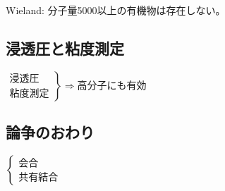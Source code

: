 \documentclass{../../../notebook}
\begin{document}
\par

Wieland: 分子量5000以上の有機物は存在しない。

\setcounter{subsection}{3}
\subsection{浸透圧と粘度測定}

$\left.\begin{array}{l}
\mathrm{浸透圧}\\\mathrm{粘度測定}
\end{array}\right\}\Rightarrow \mathrm{高分子にも有効}$

\subsection{論争のおわり}

$\begin{cases}\mathrm{会合}\\\mathrm{共有結合}\end{cases}$
\end{document}
